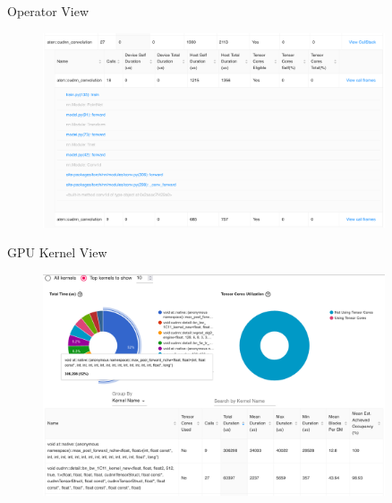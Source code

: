 \documentclass[compress,aspectratio=169]{beamer}
\begin{document}
\begin{frame}{Operator View}
    \vspace{-1em}
\begin{center}
    \begin{figure}
        \includegraphics[width=0.9\textwidth]{../../data/scap_gtx1080_profiler-torch_batch-size-64_14650758_operator-view-details}
    \end{figure}
    \end{center}
\end{frame}

\begin{frame}{GPU Kernel View}
    \vspace{-1em}
\begin{center}
    \begin{figure}
        \includegraphics[width=0.9\textwidth]{../../data/scap_gtx1080_profiler-torch_batch-size-64_14650758_gpu-kernel-view}
    \end{figure}
    \end{center}
\end{frame}
\end{document}
